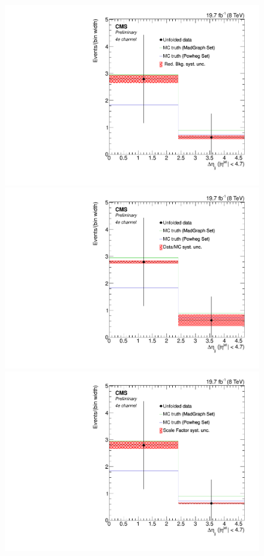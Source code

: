 \begin{figure}[hbtp]
\begin{center}
   \includegraphics[width=0.8\cmsFigWidth]{Figures/Unfolding/Systematics/ZZTo4e_Deta_RedBkg_Mad_fr}     
   \includegraphics[width=0.8\cmsFigWidth]{Figures/Unfolding/Systematics/ZZTo4e_Deta_UnfDataOverGenMC_Mad_fr}     
   \includegraphics[width=0.8\cmsFigWidth]{Figures/Unfolding/Systematics/ZZTo4e_Deta_SFSq_Mad_fr}

\end{center}
\end{figure}
